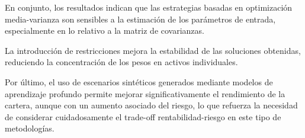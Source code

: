En conjunto, los resultados indican que las estrategias basadas en optimización media-varianza son sensibles a la estimación de los parámetros de entrada, especialmente en lo relativo a la matriz de covarianzas.

La introducción de restricciones mejora la estabilidad de las soluciones obtenidas, reduciendo la concentración de los pesos en activos individuales.

Por último, el uso de escenarios sintéticos generados mediante modelos de aprendizaje profundo permite mejorar significativamente el rendimiento de la cartera, aunque con un aumento asociado del riesgo, lo que refuerza la necesidad de considerar cuidadosamente el trade-off rentabilidad-riesgo en este tipo de metodologías.